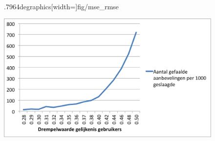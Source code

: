 \begin{figure}[htpb]   
    \label{Figuur::mse_rmse}      
  \begin{center}    
 .7964degraphics[width=\textwidth]{fig/mse_rmse}    
  \end{center}   
\end{figure}
   
\begin{figure}[htpb]   
    \label{Figuur::failed}      
  \begin{center}    
 \includegraphics[width=\textwidth]{fig/failed}    
  \end{center}   
\end{figure}

